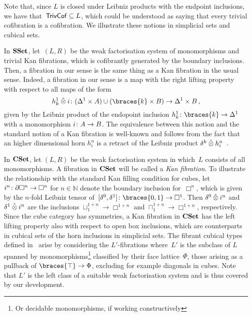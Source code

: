 \documentclass[reqno,10pt,a4paper,oneside,draft]{amsart}
\begin{document}
Note that, since $L$ is  closed under Leibniz products with the endpoint inclusions, we have that~$\mathsf{TrivCof} \subseteq L$, which 
could be understood as saying that every trivial cofibration is a cofibration. 
We  illustrate these notions in simplicial sets and cubical sets.

\begin{example} \label{thm:fib-is-kan}
In $\mathbf{SSet}$, let~$(L, R)$  be the weak factorisation system of monomorphisms and trivial Kan fibrations, which is cofibrantly generated
by the boundary inclusions. Then, a fibration in our sense  is the same thing as a Kan fibration in the usual sense. 
Indeed, a fibration in our sense is a map with the right lifting property with respect to all maps of the form
\[
h_k^1 \hatotimes i \co   (\Delta^1 \times A) \cup (\braces{k} \times B) \to  \Delta^1 \times B \, ,
\]
given by the Leibniz product of the endopoint inclusion $h_k^1 \co \braces{k} \to \Delta^1$ with a monomorphism $i \colon A \to B$. The equivalence between this notion and the standard notion of a Kan fibration is well-known and follows from the fact that an higher dimensional horn $h_i^n$ is a retract of the Leibniz product $\delta^k \mathbin{\hat{\otimes}} h_i^n$~\cite[Chap.~IV, Sec.~2]{gabriel-zisman:calculus-of-fractions}.
\end{example}

\begin{example}
In $\mathbf{CSet}$, let $(L, R)$ be the weak factorisation system in which~$L$  consists of all monomorphisms.
A  fibration in $\mathbf{CSet}$ will be called a \emph{Kan fibration}.
To illustrate the relationship with the standard Kan filling condition for cubes, let $i^n \colon \partial \Box^n \to \Box^n$ for $n \in \mathbb{N}$ denote the boundary inclusion for~$\Box^n$, which is given by the $n$-fold Leibniz tensor of~$[\lcyl, \rcyl] \co \braces{0, 1} \to \Box^1$.
Then $\delta^0 \mathbin{\hat{\otimes}} i^n$ and $\delta^1 \mathbin{\hat{\otimes}} i^n$ are the inclusions $\sqcup_1^{1+n} \to \Box^{1+n}$ and $\sqcap_1^{1+n} \to \Box^{1+n}$, respectively.
Since the cube category has symmetries, a Kan fibration in $\mathbf{CSet}$  has the left lifting property also with respect to open box inclusions, which are counterparts in cubical sets of the horn inclusions in simplicial sets.
The fibrant cubical types defined in~\cite{cohen-et-al:cubicaltt} arise by considering the  $L'$-fibrations where~$L'$ is the
subclass of $L$ spanned by monomorphisms\footnote{Or decidable monomorphisms, if working constructively} classified by their face lattice~$\Phi$, \ie those arising as a pullback of $\braces{\top} \to \Phi$, excluding for example diagonals in cubes.
Note that  $L'$ is the left class of a suitable weak factorisation system and is thus covered by our development.
\end{example}
\end{document}
